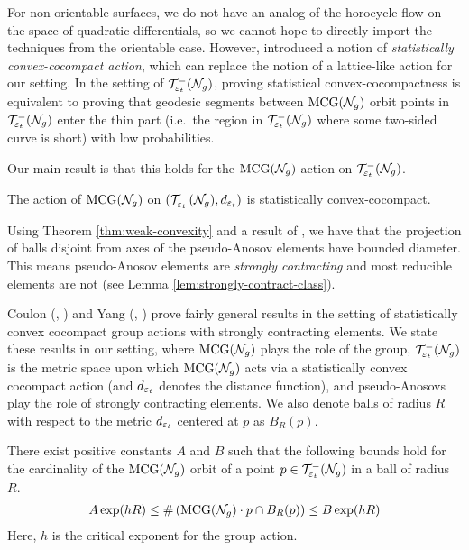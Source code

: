 For non-orientable surfaces, we do not have an analog of the horocycle flow on the space of quadratic differentials, so we cannot hope to directly import the techniques from the orientable case.
However, \textcite{10.1093/imrn/rny001} introduced a notion of \emph{statistically convex-cocompact action}, which can replace the notion of a lattice-like action for our setting.
In the setting of $\mathcal{T}_{\varepsilon_t}^{-}(\mathcal{N}_g)$, proving statistical convex-cocompactness is equivalent to proving that geodesic segments between $\mathrm{MCG}(\mathcal{N}_g)$ orbit points in $\mathcal{T}_{\varepsilon_t}^{-}(\mathcal{N}_g)$ enter the thin part (i.e.\ the region in $\mathcal{T}_{\varepsilon_t}^{-}(\mathcal{N}_g)$ where some two-sided curve is short) with low probabilities.

Our main result is that this holds for the $\mathrm{MCG}(\mathcal{N}_g)$ action on $\mathcal{T}_{\varepsilon_t}^{-}(\mathcal{N}_g)$.
\begin{theorem}
  \label{thm:statistical-convex-cocompactness}
  The action of $\mathrm{MCG}(\mathcal{N}_g)$ on $(\mathcal{T}_{\varepsilon_t}^{-}(\mathcal{N}_g), d_{\varepsilon_t})$ is statistically convex-cocompact.
\end{theorem}

Using Theorem \ref{thm:weak-convexity} and a result of \textcite{minsky1996quasi}, we have that the projection of balls disjoint from axes of the pseudo-Anosov elements have bounded diameter.
This means pseudo-Anosov elements are \emph{strongly contracting} and most reducible elements are not (see Lemma \ref{lem:strongly-contract-class}).

Coulon (\cite{coulon2022patterson}, \cite{coulon2024ergodicity}) and Yang (\cite{10.1093/imrn/rny001}, \cite{yang2020genericity}) prove fairly general results in the setting of statistically convex cocompact group actions with strongly contracting elements.
We state these results in our setting, where $\mathrm{MCG}(\mathcal{N}_g)$ plays the role of the group, $\mathcal{T}_{\varepsilon_t}^{-}(\mathcal{N}_g)$ is the metric space upon which $\mathrm{MCG}(\mathcal{N}_g)$ acts via a statistically convex cocompact action (and $d_{\varepsilon_t}$ denotes the distance function), and pseudo-Anosovs play the role of strongly contracting elements.
We also denote balls of radius $R$ with respect to the metric $d_{\varepsilon_t}$ centered at $p$ as $B_R(p)$.

\begin{theorem}
  There exist positive constants $A$ and $B$ such that the following bounds hold for the cardinality of the $\mathrm{MCG}(\mathcal{N}_g)$ orbit of a point $p \in \mathcal{T}_{\varepsilon_t}^{-}(\mathcal{N}_g)$ in a ball of radius $R$.
  \begin{align*}
    A \exp(hR) \leq \#\left( \mathrm{MCG}(\mathcal{N}_g) \cdot p \cap B_R(p) \right) \leq B \exp(hR)
  \end{align*}
  Here, $h$ is the critical exponent for the group action.
\end{theorem}

